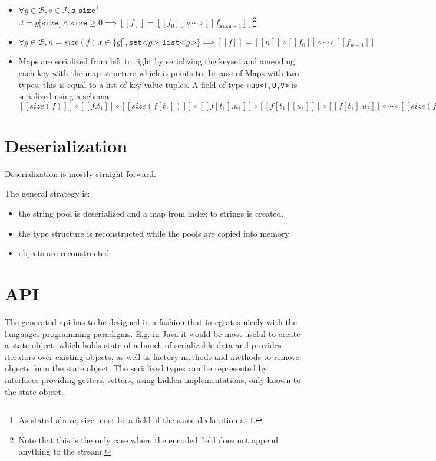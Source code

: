 \documentclass[a4paper,10pt]{article}
\newcommand{\den}[1]{\ensuremath{[\![#1]\!]}}
\begin{document}
\begin{itemize}
 \item $\forall g \in \mathcal{B}, s \in \mathcal{I}, \texttt{s size}$\footnote{As stated above, size must be a field of the same declaration as f.} $. t = g\texttt{[size]} \wedge \texttt{size} \geq 0 \implies \den{f} = \den{f_0} \circ \cdots \circ \den{f_{\texttt{size}-1}}$\footnote{Note that this is the only case where the encoded field does not append anything to the stream.}
 
 \item $\forall g \in \mathcal{B}, n = size(f). t \in \{g\texttt{[]}, \texttt{set<}g\texttt{>}, \texttt{list<}g\texttt{>}\} \implies \den{f} = \den{n} \circ \den{f_0} \circ \cdots \circ \den{f_{n-1}}$
 
 \item Maps are serialized from left to right by serializing the keyset and amending each key with the map structure which it points to. In case of Maps with two types, this is equal to a list of key value tuples.
 A field of type \verb/map<T,U,V>/ is serialized using a schema $ \den{size(f)} \circ \den{f.t_1} \circ \den{size(f[t_1])} \circ \den{f[t_1].u_1} \circ \den{f[t_1][u_1]} \circ \den{f[t_1].u_2} \circ \cdots \circ \den{size(f[t_2])} \circ \cdots \circ \den{f[t_n][u_m]}$
\end{itemize}




\section{Deserialization}

Deserialization is mostly straight forward.

The general strategy is:
\begin{itemize}
 \item the string pool is deserialized and a map from index to strings is created.
 \item the type structure is reconstructed while the pools are copied into memory
 \item objects are reconstructed
\end{itemize}


\section{API}

The generated \gls{api} has to be designed in a fashion that integrates nicely with the languages programming paradigms. E.g. in Java it would be most useful to create a state object, which holds state of a bunch of serializable data and provides iterators over existing objects, as well as factory methods and methods to remove objects form the state object. The serialized types can be represented by interfaces providing getters, setters, using hidden implementations, only known to the state object.
\end{document}
